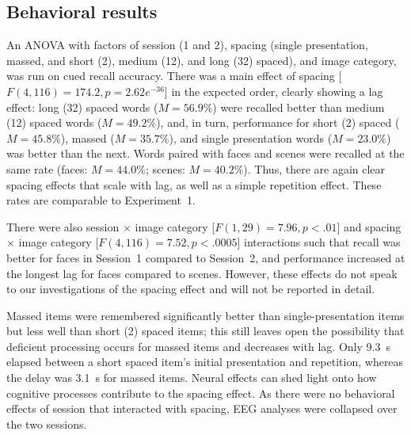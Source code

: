 




\subsection{Behavioral results}

An ANOVA with factors of session (1 and 2), spacing (single presentation, massed, and short (2), medium (12), and long (32) spaced), and image category, was run on cued recall accuracy.  There was a main effect of spacing [$F(4,116)=174.2, p=2.62e^{-36}$] in the expected order, clearly showing a lag effect: long (32) spaced words ($M=56.9\%$) were recalled better than medium (12) spaced words ($M=49.2\%$), and, in turn, performance for short (2) spaced ($M=45.8\%$), massed ($M=35.7\%$), and single presentation words ($M=23.0\%$) was better than the next.  Words paired with faces and scenes were recalled at the same rate (faces: $M=44.0\%$; scenes: $M=40.2\%$).  Thus, there are again clear spacing effects that scale with lag, as well as a simple repetition effect. These rates are comparable to Experiment~1.

There were also session $\times$ image category [$F(1,29)=7.96, p<.01$] and spacing $\times$ image category [$F(4,116)=7.52, p<.0005$] interactions such that recall was better for faces in Session~1 compared to Session~2, and performance increased at the longest lag for faces compared to scenes.  However, these effects do not speak to our investigations of the spacing effect and will not be reported in detail.

Massed items were remembered significantly better than single-presentation items but less well than short (2) spaced items; this still leaves open the possibility that deficient processing occurs for massed items and decreases with lag.  Only 9.3~s elapsed between a short spaced item's initial presentation and repetition, whereas the delay was 3.1~s for massed items.  Neural effects can shed light onto how cognitive processes contribute to the spacing effect.  As there were no behavioral effects of session that interacted with spacing, EEG analyses were collapsed over the two sessions.

